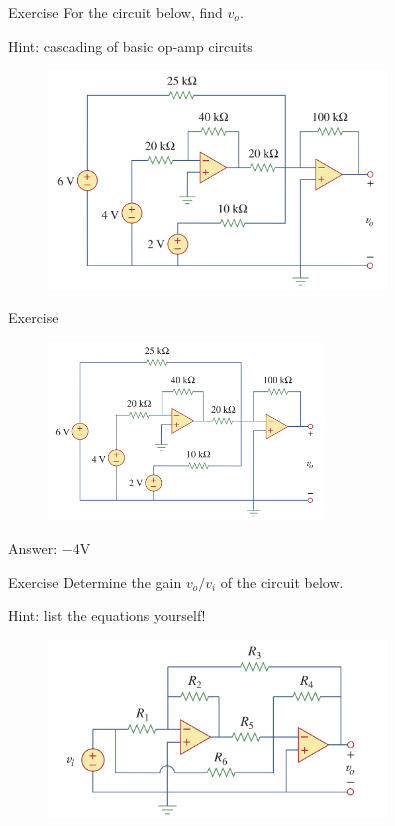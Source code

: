 \documentclass{beamer}
\begin{document}
\begin{frame}{Exercise}
For the circuit below, find $v_o$.

Hint: cascading of basic op-amp circuits
\begin{figure}[H]
    \centering
    \includegraphics[width=0.8\textwidth]{img_opamp/exercise.png}
\end{figure}
    
\end{frame}

\begin{frame}{Exercise}
\begin{figure}[H]
    \centering
    \includegraphics[width=0.65\textwidth]{img_opamp/exercise.png}
\end{figure}
Answer: $-4\text{V}$
    
\end{frame}

\begin{frame}{Exercise}
Determine the gain $v_o/v_i$ of the circuit below.

Hint: list the equations yourself!
\begin{figure}[H]
    \centering
    \includegraphics[width=0.8\textwidth]{img_opamp/exercise2.png}
\end{figure}
    
\end{frame}
\end{document}
